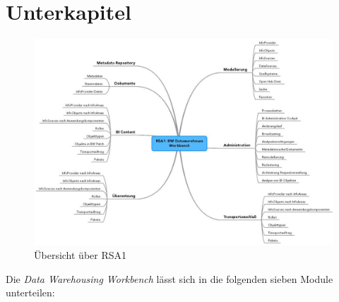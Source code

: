 \chapter{Unterkapitel}
\label{Abschnitt:Motivation}

\begin{figure}[H]
    \centering
    \includegraphics[width=1\textwidth]{files/RSA1Mindmap}
    \caption{Übersicht über RSA1}
    \label{pic:DWOverview}
\end{figure}


Die \textit{ Data Warehousing Workbench} lässt sich in die folgenden sieben Module unterteilen:\\


